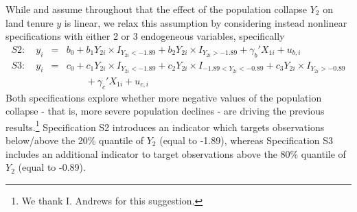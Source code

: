 \documentclass[12pt]{article}
\newcommand{\1}{\mathbf{1}}
\begin{document}
\begin{table}
\begin{center}
\caption{\small 95\% confidence intervals for the population collapse
 obtained using a grid of 2,500 evenly spread points over $[-2.5,0]$ and 499 bootstraps to generate critical values.}
\label{table:Mexico}
\end{center}
\end{table}

While \cite{Mexico} and \cite{antoine_identification-robust_2023}
assume throughout that the effect of the population collapse $Y_{2}$
on land tenure $y$ is linear, we relax this assumption by considering
 instead  nonlinear specifications with either 2 or 3 endogeneous
 variables, specifically
\begin{eqnarray*}
S2: \quad  y_i &= & b_0 + b_1 Y_{2i} \times I_{Y_{2i}<-1.89} + b_2 Y_{2i} \times I_{Y_{2i}>-1.89}
+ \gamma_b' X_{1i} + u_{b,i}  \label{eq:mexico nonlinear 2endo}  \\
S3: \quad  y_i &= & c_0 + c_1 Y_{2i} \times I_{Y_{2i}<-1.89} + c_2
Y_{2i} \times I_{-1.89<Y_{2i}<-0.89} + c_3 Y_{2i} \times I_{Y_{2i}>-0.89}\\
&& \qquad
+ \gamma_c' X_{1i} + u_{c,i}  \label{eq:mexico nonlinear 3endo}
\end{eqnarray*}
Both specifications explore whether more negative values of the
population collapse - that is, more severe population declines - are
driving the previous results.\footnote{We thank I. Andrews for this
suggestion.}  Specification S2 introduces an indicator which targets observations below/above the 20\%
quantile of $Y_2$ (equal to -1.89), whereas Specification S3 includes
an additional indicator to target observations above the 80\% quantile
of $Y_2$ (equal to -0.89).
\end{document}
